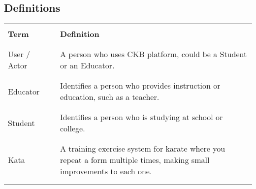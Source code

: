 \subsection{Definitions}
\begin{table}[H]
    \centering
    \renewcommand{\arraystretch}{0.5}
    \begin{tabular}{l l p{10cm}}
        \hline
                            &        &                                                                                                                        \\
        \textbf{Term}       & \vline & \textbf{Definition}                                                                                                    \\
                            &        &                                                                                                                        \\\hline \\
        User / Actor        & \vline & A person who uses CKB platform, could be a Student or an Educator.                                                     \\       
                            &        &                                                                                                                        \\\hline \\
        Educator            & \vline & Identifies a person who provides instruction or education, such as a teacher.                                          \\
                            &        &                                                                                                                        \\\hline \\
        Student             & \vline & Identifies a person who is studying at school or college.                                                              \\
                            &        &                                                                                                                        \\\hline \\
        Kata                & \vline & A training exercise system for karate where you repeat a form multiple times, making small improvements to each one.   \\
                            &        &                                                                                                                        \\\hline \\

\end{tabular}
\end{table}
